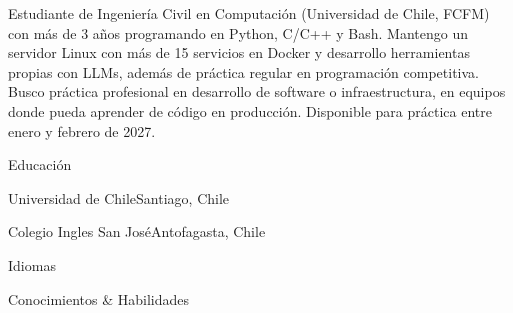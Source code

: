 \documentclass[
	spanish, %
	letterpaper
]{article}
\begin{document}
\templatePagecfg

\begin{summarynocol}[none]%
	\noindent Estudiante de Ingeniería Civil en Computación (Universidad de Chile, FCFM) con más de 3 años programando en Python, C/C++ y Bash. Mantengo un servidor Linux con más de 15 servicios en Docker y desarrollo herramientas propias con LLMs, además de práctica regular en programación competitiva. Busco práctica profesional en desarrollo de software o infraestructura, en equipos donde pueda aprender de código en producción. Disponible para práctica entre enero y febrero de 2027.
\end{summarynocol}

\begin{cvsblock}{Educación}
	\begin{institution}{Universidad de Chile}{Santiago, Chile}
	\end{institution}

	\begin{institution}{Colegio Ingles San José}{Antofagasta, Chile}
	\end{institution}
\end{cvsblock}

\begin{cvsblock}{Idiomas}
\end{cvsblock}

\begin{cvsblock}{Conocimientos \& Habilidades}
\end{cvsblock}
\end{document}
